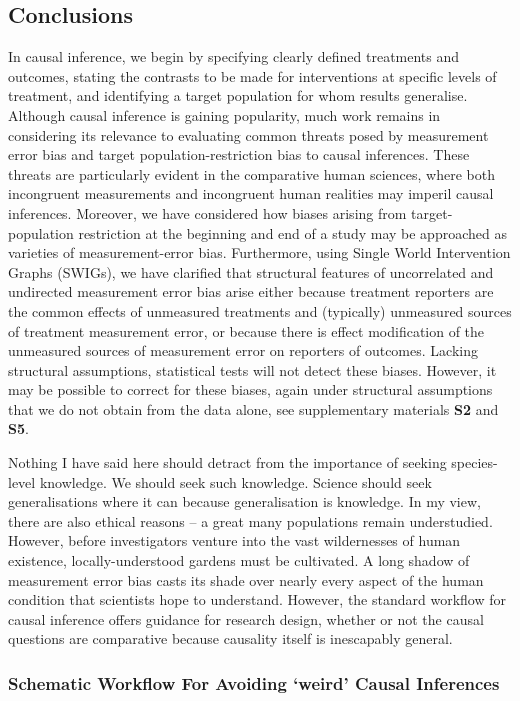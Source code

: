 \documentclass[
  single column]{article}
\begin{document}
\subsection{Conclusions}\label{conclusions}

In causal inference, we begin by specifying clearly defined treatments
and outcomes, stating the contrasts to be made for interventions at
specific levels of treatment, and identifying a target population for
whom results generalise. Although causal inference is gaining
popularity, much work remains in considering its relevance to evaluating
common threats posed by measurement error bias and target
population-restriction bias to causal inferences. These threats are
particularly evident in the comparative human sciences, where both
incongruent measurements and incongruent human realities may imperil
causal inferences. Moreover, we have considered how biases arising from
target-population restriction at the beginning and end of a study may be
approached as varieties of measurement-error bias. Furthermore, using
Single World Intervention Graphs (SWIGs), we have clarified that
structural features of uncorrelated and undirected measurement error
bias arise either because treatment reporters are the common effects of
unmeasured treatments and (typically) unmeasured sources of treatment
measurement error, or because there is effect modification of the
unmeasured sources of measurement error on reporters of outcomes.
Lacking structural assumptions, statistical tests will not detect these
biases. However, it may be possible to correct for these biases, again
under structural assumptions that we do not obtain from the data alone,
see supplementary materials \textbf{S2} and \textbf{S5}.

Nothing I have said here should detract from the importance of seeking
species-level knowledge. We should seek such knowledge. Science should
seek generalisations where it can because generalisation is knowledge.
In my view, there are also ethical reasons -- a great many populations
remain understudied. However, before investigators venture into the vast
wildernesses of human existence, locally-understood gardens must be
cultivated. A long shadow of measurement error bias casts its shade over
nearly every aspect of the human condition that scientists hope to
understand. However, the standard workflow for causal inference offers
guidance for research design, whether or not the causal questions are
comparative because causality itself is inescapably general.

\subsubsection{Schematic Workflow For Avoiding `weird' Causal
Inferences}\label{schematic-workflow-for-avoiding-weird-causal-inferences}
\end{document}
